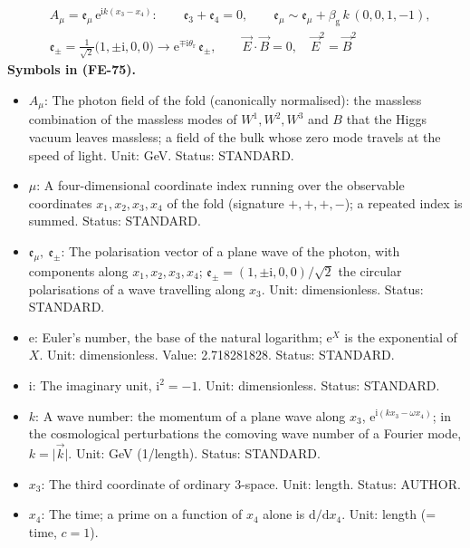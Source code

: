 \documentclass[
  10pt,
]{article}
\providecommand{\tightlist}{%
  \setlength{\itemsep}{0pt}\setlength{\parskip}{0pt}}
\begin{document}
\[
\begin{aligned}
&A_\mu = \mathfrak{e}_\mu\,\mathrm{e}^{\mathrm{i}k(x_3 - x_4)}:\qquad \mathfrak{e}_3 + \mathfrak{e}_4 = 0,\qquad
\mathfrak{e}_\mu \sim \mathfrak{e}_\mu + \beta_{\mathrm{g}}\,k\,(0, 0, 1, -1),\\
&\mathfrak{e}_\pm = \frac{1}{\sqrt2}\big(1, \pm\mathrm{i}, 0, 0\big) \to \mathrm{e}^{\mp\mathrm{i}\theta_{\mathrm{r}}}\,\mathfrak{e}_\pm,\qquad
\vec E\cdot\vec B = 0,\quad \vec E^2 = \vec B^2
\end{aligned} \tag{FE-75}
\] \textbf{Symbols in (FE-75).}

\begin{itemize}
\tightlist
\item
  \(A_\mu\): The photon field of the fold (canonically normalised): the
  massless combination of the massless modes of \(W^1, W^2, W^3\) and
  \(B\) that the Higgs vacuum leaves massless; a field of the bulk whose
  zero mode travels at the speed of light. Unit: GeV. Status: STANDARD.
\item
  \(\mu\): A four-dimensional coordinate index running over the
  observable coordinates \(x_1, x_2, x_3, x_4\) of the fold (signature
  \(+,+,+,-\)); a repeated index is summed. Status: STANDARD.
\item
  \(\mathfrak{e}_\mu,\ \mathfrak{e}_\pm\): The polarisation vector of a
  plane wave of the photon, with components along
  \(x_1, x_2, x_3, x_4\);
  \(\mathfrak{e}_\pm = (1, \pm\mathrm{i}, 0, 0)/\sqrt2\) the circular
  polarisations of a wave travelling along \(x_3\). Unit: dimensionless.
  Status: STANDARD.
\item
  \(\mathrm{e}\): Euler's number, the base of the natural logarithm;
  \(\mathrm{e}^{X}\) is the exponential of \(X\). Unit: dimensionless.
  Value: 2.718281828. Status: STANDARD.
\item
  \(\mathrm{i}\): The imaginary unit, \(\mathrm{i}^2 = -1\). Unit:
  dimensionless. Status: STANDARD.
\item
  \(k\): A wave number: the momentum of a plane wave along \(x_3\),
  \(\mathrm{e}^{\mathrm{i}(kx_3 - \omega x_4)}\); in the cosmological
  perturbations the comoving wave number of a Fourier mode,
  \(k = \lvert\vec k\rvert\). Unit: GeV (1/length). Status: STANDARD.
\item
  \(x_3\): The third coordinate of ordinary 3-space. Unit: length.
  Status: AUTHOR.
\item
  \(x_4\): The time; a prime on a function of \(x_4\) alone is
  \(\mathrm{d}/\mathrm{d}x_4\). Unit: length (= time, \(c = 1\)).

\end{itemize}
\end{document}
